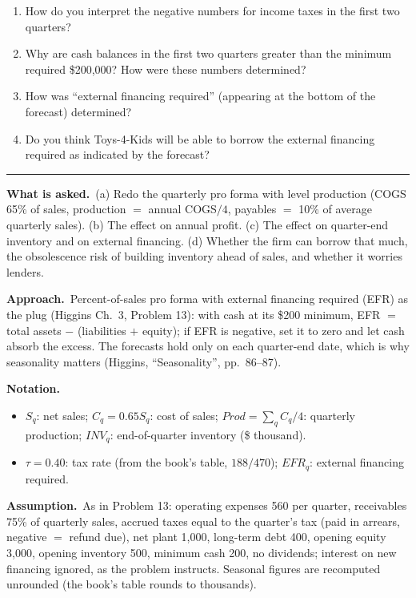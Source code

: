 \documentclass[11pt,a4paper]{article}
\newcommand{\notation}{\par\noindent\textbf{Notation.}}
\newcommand{\assume}{\par\smallskip\noindent\textbf{Assumption.}~}
\newcommand{\asked}{\par\medskip\noindent\textbf{What is asked.}~}
\newcommand{\approach}{\par\smallskip\noindent\textbf{Approach.}~}
\newcommand{\stmtend}{\par\endgroup\nopagebreak\noindent\rule{\linewidth}{0.4pt}\par\medskip}
\begin{document}
\begin{enumerate}
\def\labelenumi{\alph{enumi}.}
\item
  How do you interpret the negative numbers for income taxes in the first two quarters?
\item
  Why are cash balances in the first two quarters greater than the minimum required \$200,000? How
  were these numbers determined?
\item
  How was ``external financing required'' (appearing at the bottom of the forecast) determined?
\item
  Do you think Toys-4-Kids will be able to borrow the external financing required as indicated by
  the forecast?
\end{enumerate}
\stmtend

\asked (a) Redo the quarterly pro forma with level production (COGS 65\% of sales, production
$=$ annual COGS$/4$, payables $=$ 10\% of average quarterly sales). (b) The effect on annual
profit. (c) The effect on quarter-end inventory and on external financing. (d) Whether the firm
can borrow that much, the obsolescence risk of building inventory ahead of sales, and whether it
worries lenders.

\approach Percent-of-sales pro forma with external financing required (EFR) as the plug (Higgins
Ch.~3, Problem 13): with cash at its \$200 minimum, EFR $=$ total assets $-$ (liabilities $+$
equity); if EFR is negative, set it to zero and let cash absorb the excess. The forecasts hold
only on each quarter-end date, which is why seasonality matters (Higgins, ``Seasonality'',
pp.~86--87).

\notation
\begin{itemize}
  \item $S_q$: net sales; $C_q = 0.65 S_q$: cost of sales; $Prod = \sum_q C_q/4$: quarterly
        production; $INV_q$: end-of-quarter inventory (\$ thousand).
  \item $\tau = 0.40$: tax rate (from the book's table, $188/470$); $EFR_q$: external financing required.
\end{itemize}
\assume As in Problem 13: operating expenses 560 per quarter, receivables 75\% of quarterly sales,
accrued taxes equal to the quarter's tax (paid in arrears, negative $=$ refund due), net plant
1{,}000, long-term debt 400, opening equity 3{,}000, opening inventory 500, minimum cash 200,
no dividends; interest on new financing ignored, as the problem instructs. Seasonal figures are
recomputed unrounded (the book's table rounds to thousands).
\end{document}
